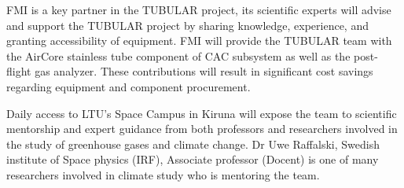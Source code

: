 FMI is a key partner in the TUBULAR project, its scientific experts will advise and support the TUBULAR project by sharing knowledge, experience, and granting accessibility of equipment. FMI will provide the TUBULAR team with the AirCore stainless tube component of CAC subsystem as well as the post-flight gas analyzer. These contributions will result in significant cost savings regarding equipment and component procurement.

Daily access to LTU's Space Campus in Kiruna will expose the team to scientific mentorship and expert guidance from both professors and researchers involved in the study of greenhouse gases and climate change. Dr Uwe Raffalski, Swedish institute of Space physics (IRF), Associate professor (Docent) is one of many researchers involved in climate study who is mentoring the team.
